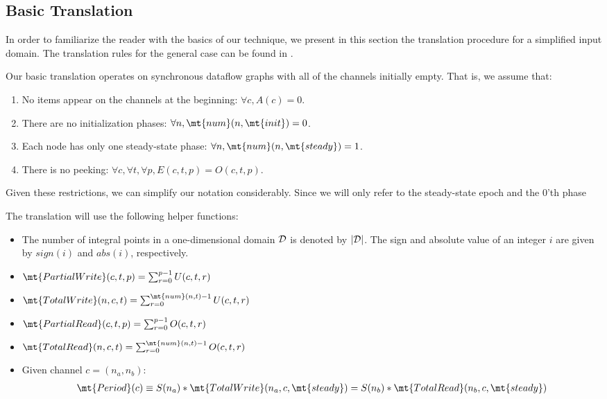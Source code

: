 \subsection{Basic Translation}

In order to familiarize the reader with the basics of our technique,
we present in this section the translation procedure for a simplified
input domain.  The translation rules for the general case can be found
in .

Our basic translation operates on synchronous dataflow graphs with all
of the channels initially empty.  That is, we assume that:
\begin{enumerate}

\item No items appear on the channels at the beginning:  $\forall c, A(c) = 0$.

\item There are no initialization phases: $\forall n, \mt{num}(n, \mt{init}) = 0$.

\item Each node has only one steady-state phase: $\forall n, \mt{num}(n, \mt{steady}) = 1$.

\item There is no peeking: $\forall c, \forall t, \forall p, E(c, t, p) = O(c, t, p)$.

\end{enumerate}

Given these restrictions, we can simplify our notation considerably.
Since we will only refer to the steady-state epoch and the 0'th phase 


The translation will use the following helper functions:
\begin{itemize}

\item The number of integral points in a one-dimensional domain ${\cal
D}$ is denoted by $|{\cal D}|$.  The sign and absolute value of an
integer $i$ are given by $sign(i)$ and $abs(i)$, respectively.

\item $\mt{PartialWrite}(c,t,p) = \sum_{r=0}^{p-1} U(c, t, r)$

\item $\mt{TotalWrite}(n,c,t) = \sum_{r=0}^{\mt{num}(n, t)-1} U(c, t, r)$

\item $\mt{PartialRead}(c,t,p) = \sum_{r=0}^{p-1} O(c, t, r)$

\item $\mt{TotalRead}(n,c,t) =  \sum_{r=0}^{\mt{num}(n, t)-1} O(c, t, r)$

\item Given channel $c = (n_a, n_b)$:
\begin{align*}
\mt{Period}(c) \equiv S(n_a) * \mt{TotalWrite}(n_a, c, \mt{steady}) = 
S(n_b) * \mt{TotalRead}(n_b, c, \mt{steady})
\end{align*}

\end{itemize}

